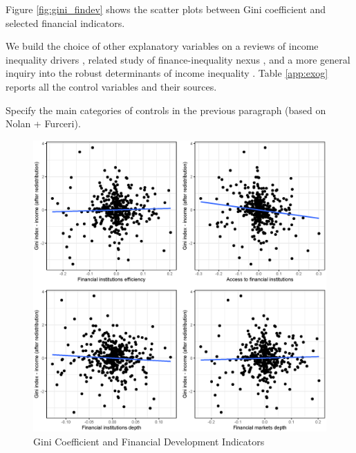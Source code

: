\documentclass[a4paper,11pt]{article}
\begin{document}
Figure \ref{fig:gini_findev} shows the scatter plots between Gini coefficient and selected financial indicators.

We build the choice of other explanatory variables on a reviews of income inequality drivers \citep{roineetal2009,nolan2019drivers}, related study of finance-inequality nexus \citep{de2017finance}, and a more general inquiry into the robust determinants of income inequality \citep{furceri2019robust}. Table \ref{app:exog} reports all the control variables and their sources. 

Specify the main categories of controls in the previous paragraph (based on Nolan + Furceri).



\begin{figure}
    \label{fig:gini_findev_dm}
        \caption{Gini Coefficient and Financial Development Indicators}
    \includegraphics[width=\textwidth, keepaspectratio]{figures/plots_findev_gini_dm}
    \end{figure}
\end{document}
